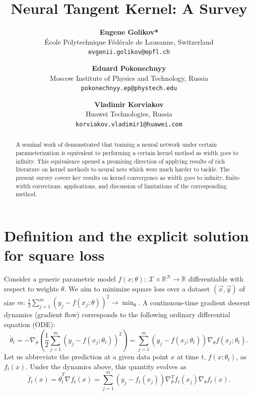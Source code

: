 \documentclass{article}
\title{Neural Tangent Kernel: A Survey}
\author{
    \textbf{Eugene Golikov*}
    \\École Polytechnique Fédérale de Lausanne, Switzerland
    \\\texttt{evgenii.golikov@epfl.ch}
    \and
    \textbf{Eduard Pokonechnyy}
    \\Moscow Institute of Physics and Technology, Russia
    \\\texttt{pokonechnyy.ep@phystech.edu}
    \and
    \textbf{Vladimir Korviakov}
    \\Huawei Technologies, Russia
    \\\texttt{korviakov.vladimir1@huawei.com}
}
\newcommand{\XX}{\mathcal{X}}
\newcommand{\RR}{\mathbb{R}}
\begin{document}
    \maketitle

    \tableofcontents


    \begin{abstract}

    A seminal work of \cite{jacot2018neural} demonstrated that training a neural network under certain parameterization is equivalent to performing a certain kernel method as width goes to infinity.
    This equivalence opened a promising direction of applying results of rich literature on kernel methods to neural nets which were much harder to tackle.
    The present survey covers key results on kernel convergence as width goes to infinity, finite-width corrections, applications, and discussion of limitations of the corresponding method.
    \end{abstract}


    \section{Definition and the explicit solution for square loss}
    \label{sec:definition}

    Consider a generic parametric model $f(x; \theta): \, \XX \times \RR^N \to \RR$ differentiable with respect to weights $\theta$.
    We aim to minimize square loss over a dataset $(\vec x, \vec y)$ of size $m$: $\frac{1}{2} \sum_{j=1}^m (y_j - f(x_j; \theta))^2 \to \min_\theta$.
    A continuous-time gradient descent dynamics (gradient flow) corresponds to the following ordinary differential equation (ODE):
    \begin{equation}
        \dot\theta_t
        = -\nabla_\theta\left(\frac{1}{2} \sum_{j=1}^m (y_j - f(x_j; \theta_t))^2\right)
        = \sum_{j=1}^m (y_j - f(x_j; \theta_t)) \nabla_\theta f(x_j; \theta_t).
    \end{equation}
    Let us abbreviate the prediction at a given data point $x$ at time $t$, $f(x; \theta_t)$, as $f_t(x)$.
    Under the dynamics above, this quantity evolves as
    \begin{equation}
        \dot f_t(x)
        = \dot\theta_t^T \nabla f_t(x)
        = \sum_{j=1}^m (y_j - f_t(x_j)) \nabla_\theta^T f_t(x_j) \nabla_\theta f_t(x).
        \label{eq:f_t_dynamics}
    \end{equation}
    
\end{document}
